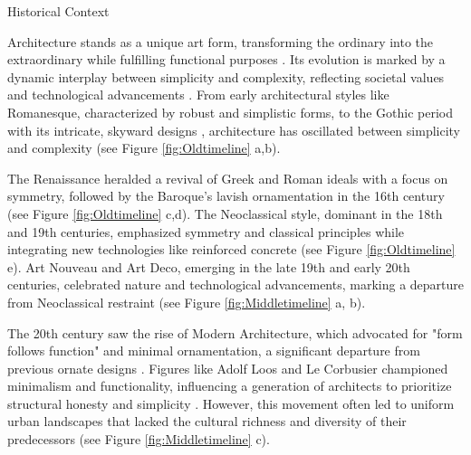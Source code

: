 


Historical Context


Architecture stands as a unique art form, transforming the ordinary into the extraordinary while fulfilling functional purposes \cite{Hnin2022}.
Its evolution is marked by a dynamic interplay between simplicity and complexity, reflecting societal values and technological advancements \cite{Economakis2023}.
From early architectural styles like Romanesque, characterized by robust and simplistic forms, to the Gothic period with its intricate, skyward designs \cite{Stacbond2020}, architecture has oscillated between simplicity and complexity (see Figure \ref{fig:Oldtimeline} a,b).

The Renaissance heralded a revival of Greek and Roman ideals with a focus on symmetry, followed by the Baroque's lavish ornamentation in the 16th century \cite{Economakis2023} (see Figure \ref{fig:Oldtimeline} c,d).
The Neoclassical style, dominant in the 18th and 19th centuries, emphasized symmetry and classical principles while integrating new technologies like reinforced concrete \cite{Economakis2023} (see Figure \ref{fig:Oldtimeline} e).
Art Nouveau and Art Deco, emerging in the late 19th and early 20th centuries, celebrated nature and technological advancements, marking a departure from Neoclassical restraint \cite{Salas2018, Arora2023} (see Figure \ref{fig:Middletimeline} a, b).

The 20th century saw the rise of Modern Architecture, which advocated for "form follows function" and minimal ornamentation, a significant departure from previous ornate designs \cite{Gage2015}.
Figures like Adolf Loos and Le Corbusier championed minimalism and functionality, influencing a generation of architects to prioritize structural honesty and simplicity \cite{Saglam2014}.
However, this movement often led to uniform urban landscapes that lacked the cultural richness and diversity of their predecessors (see Figure \ref{fig:Middletimeline} c).

